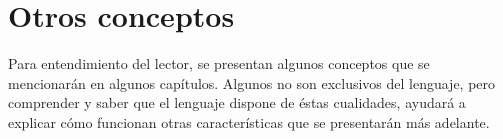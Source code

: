 \section{Otros conceptos}

Para entendimiento del lector, se presentan algunos conceptos que se mencionarán en algunos capítulos. Algunos no son exclusivos del lenguaje, pero comprender y saber que el lenguaje dispone de éstas cualidades, ayudará a explicar cómo funcionan otras características que se presentarán más adelante.




